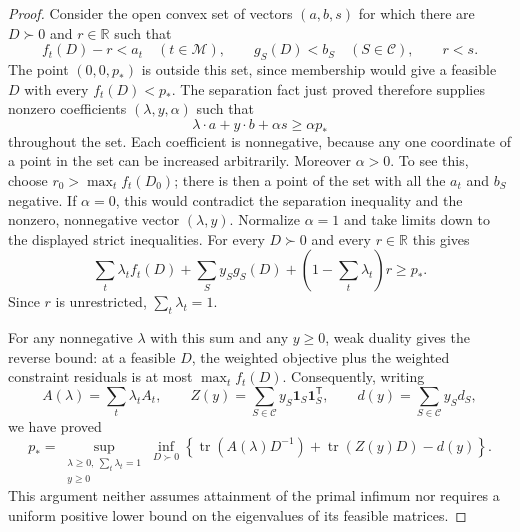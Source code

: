 \documentclass[11pt]{amsart}
\theoremstyle{definition}
\theoremstyle{remark}
\numberwithin{equation}{section}
\begin{document}
\begin{proof}
Consider the open convex set of vectors $(a,b,s)$ for which there are
$D\succ0$ and $r\in\mathbb R$ such that
\[
 f_t(D)-r<a_t\quad(t\in\mathcal M),\qquad
 g_S(D)<b_S\quad(S\in\mathcal C),\qquad r<s.
\]
The point $(0,0,p_*)$ is outside this set, since membership would give a
feasible $D$ with every $f_t(D)<p_*$.  The separation fact just proved
therefore supplies nonzero coefficients $(\lambda,y,\alpha)$ such that
\[
 \lambda\cdot a+y\cdot b+\alpha s\geq\alpha p_*
\]
throughout the set.  Each coefficient is nonnegative, because any one
coordinate of a point in the set can be increased arbitrarily.
Moreover $\alpha>0$.  To see this, choose
$r_0>\max_t f_t(D_0)$; there is then a point of the set with all the
$a_t$ and $b_S$ negative.  If $\alpha=0$, this would contradict the
separation inequality and the nonzero, nonnegative vector $(\lambda,y)$.
Normalize $\alpha=1$ and take limits down to the displayed strict
inequalities.  For every $D\succ0$ and every $r\in\mathbb R$ this gives
\[
 \sum_t\lambda_tf_t(D)+\sum_Sy_Sg_S(D)
       +\left(1-\sum_t\lambda_t\right)r\geq p_*.
\]
Since $r$ is unrestricted, $\sum_t\lambda_t=1$.

For any nonnegative $\lambda$ with this sum and any $y\geq0$, weak
duality gives the reverse bound: at a feasible $D$, the weighted
objective plus the weighted constraint residuals is at most
$\max_t f_t(D)$.  Consequently, writing
\[
 A(\lambda)=\sum_t\lambda_tA_t,\qquad
 Z(y)=\sum_{S\in\mathcal C}y_S\mathbf1_S\mathbf1_S^{\mathsf T},\qquad
 d(y)=\sum_{S\in\mathcal C}y_Sd_S,
\]
we have proved
\begin{equation}
\label{hd:lagrange}
 p_*=
 \sup_{\substack{\lambda\geq0,\ \sum_t\lambda_t=1\\y\geq0}}
 \inf_{D\succ0}
 \left\{\operatorname{tr}(A(\lambda)D^{-1})
       +\operatorname{tr}(Z(y)D)-d(y)\right\}.
\end{equation}
This argument neither assumes attainment of the primal infimum nor
requires a uniform positive lower bound on the eigenvalues of its
feasible matrices.


\end{proof}
\end{document}
